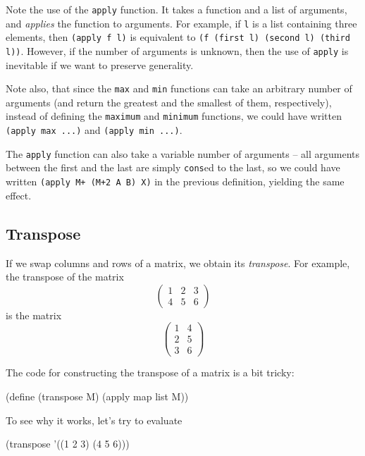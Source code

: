 Note the use of the \texttt{apply} function. It takes
a function and a list of arguments, and \textit{applies}
the function to arguments. For example, if \texttt{l}
is a list containing three elements, then
\texttt{(apply f l)} is equivalent to
\texttt{(f (first l) (second l) (third l))}. However,
if the number of arguments is unknown, then the use
of \texttt{apply} is inevitable if we want to preserve
generality.

Note also, that since the \texttt{max} and \texttt{min}
functions can take an arbitrary number of arguments
(and return the greatest and the smallest of them,
respectively), instead of defining the \texttt{maximum}
and \texttt{minimum} functions, we could have written
\texttt{(apply max ...)} and \texttt{(apply min ...)}.

The \texttt{apply} function can also take a variable
number of arguments -- all arguments between the first
and the last are simply \texttt{cons}ed to the last,
so we could have written \texttt{(apply M+ (M+2 A B) X)}
in the previous definition, yielding the same effect.

\subsection{Transpose}
If we swap columns and rows of a matrix, we obtain
its \textit{transpose}. For example, the transpose
of the matrix
\begin{equation*}
  \begin{pmatrix}
    1 & 2 & 3 \\
    4 & 5 & 6 
  \end{pmatrix}
\end{equation*}
is the matrix
\begin{equation*}
  \begin{pmatrix}
    1 & 4 \\
    2 & 5 \\
    3 & 6
  \end{pmatrix}
\end{equation*}

The code for constructing the transpose of a matrix is
a bit tricky:

\begin{Snippet}
(define (transpose M)
  (apply map list M))
\end{Snippet}

To see why it works, let's try to evaluate
\begin{Snippet}
(transpose '((1 2 3)
             (4 5 6)))
\end{Snippet}

